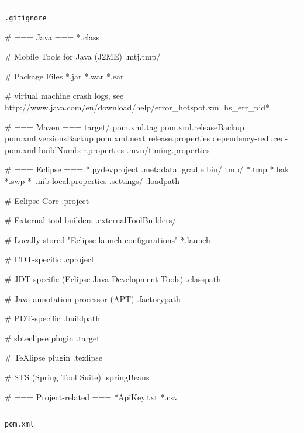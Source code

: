 \noindent\rule{\textwidth}{0.4pt}

\nointerlineskip
\texttt{.gitignore}

\begin{textcode}
# === Java ===
*.class

# Mobile Tools for Java (J2ME)
.mtj.tmp/

# Package Files
*.jar
*.war
*.ear

# virtual machine crash logs, see http://www.java.com/en/download/help/error_hotspot.xml
hs_err_pid*


# === Maven ===
target/
pom.xml.tag
pom.xml.releaseBackup
pom.xml.versionsBackup
pom.xml.next
release.properties
dependency-reduced-pom.xml
buildNumber.properties
.mvn/timing.properties


# === Eclipse ===
*.pydevproject
.metadata
.gradle
bin/
tmp/
*.tmp
*.bak
*.swp
*~.nib
local.properties
.settings/
.loadpath

# Eclipse Core
.project

# External tool builders
.externalToolBuilders/

# Locally stored "Eclipse launch configurations"
*.launch

# CDT-specific
.cproject

# JDT-specific (Eclipse Java Development Tools)
.classpath

# Java annotation processor (APT)
.factorypath

# PDT-specific
.buildpath

# sbteclipse plugin
.target

# TeXlipse plugin
.texlipse

# STS (Spring Tool Suite)
.springBeans


# === Project-related ===
*ApiKey.txt
*.csv
\end{textcode}

\noindent\rule{\textwidth}{0.4pt}

\nointerlineskip
\texttt{pom.xml}

